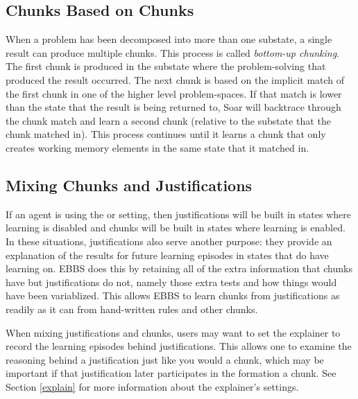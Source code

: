 \subsection{Chunks Based on Chunks}
\label{CHUNKING-subtleties-chunkchunks}

When a problem has been decomposed into more than one substate, a single result can produce multiple chunks.  This process is called \textit{bottom-up chunking}.  The first chunk is produced in the substate where the problem-solving that produced the result occurred.  The next chunk is based on the implicit match of the first chunk in one of the higher level problem-spaces.  If that match is lower than the state that the result is being returned to, Soar will backtrace through the chunk match and learn a second chunk (relative to the substate that the chunk matched in).  This process continues until it learns a chunk that only creates working memory elements in the same state that it matched in.

\subsection{Mixing Chunks and Justifications}
\label{CHUNKING-subtleties-justifications}

If an agent is using the  or  setting, then justifications will be built in states where learning is disabled and chunks will be built in states where learning is enabled.  In these situations, justifications also serve another purpose:  they provide an explanation of the results for future learning episodes in states that do have learning on.  EBBS does this by retaining all of the extra information that chunks have but justifications do not, namely those extra tests and how things would have been variablized.  This allows EBBS to learn chunks from justifications as readily as it can from hand-written rules and other chunks.

When mixing justifications and chunks, users may want to set the explainer to record the learning episodes behind justifications.  This allows one to examine the reasoning behind a justification just like you would a chunk, which may be important if that justification later participates in the formation a chunk. See Section \ref{explain} for more information about the explainer's settings.

